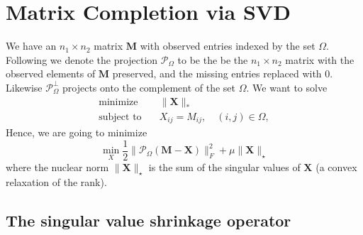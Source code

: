 \documentclass[conference,onecolumn,12pt]{IEEEtran}
\newcommand{\mtx}[1]{\bm{#1}}
\numberwithin{equation}{section}
\numberwithin{figure}{section}
\numberwithin{table}{section}
\theoremstyle{definition}
\begin{document}
\section{Matrix Completion via SVD}
We have an $n_1\times n_2$ matrix $\mtx{M}$ with observed entries indexed by the set $\Omega$. Following \cite{mazumder2010spectral} we denote the projection $\mathcal{P}_{\Omega}$ to be the be the $n_1\times n_2$ matrix with the observed elements of $\mtx{M}$ preserved, and the missing entries replaced
with 0. Likewise $\mathcal{P}_\Omega^\perp$ projects onto the complement of the set $\Omega$. We want to solve
\begin{equation}
  \label{eqn:min}
  \begin{array}{ll}
    \textrm{minimize}   & \quad \|\mtx{X}\|_*\\
    \textrm{subject to} & \quad X_{ij} = M_{ij}, \quad (i,j) \in \Omega,
 \end{array}
\end{equation}
Hence, we are going to minimize
\begin{equation}
  \label{eqn:minnuc+fro}
    \min_X \frac{1}{2}\|\mathcal{P}_\Omega(\mtx{M}-\mtx{X})\|_F^2 +\mu \|\mtx{X}\|_\star
\end{equation}
where the nuclear norm $ \|\mtx{X}\|_\star$ is the sum of the singular values of $\mtx{X}$ (a convex relaxation of the rank).

\subsection{The singular value shrinkage operator}
\end{document}
